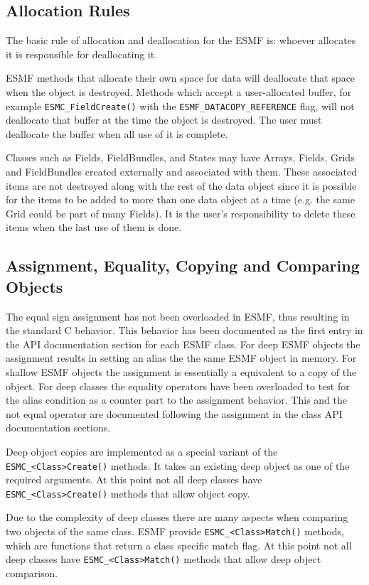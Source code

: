\subsection{Allocation Rules}

The basic rule of allocation and deallocation for the ESMF is:
whoever allocates it is responsible for deallocating it.

ESMF methods that allocate their own space for data will
deallocate that space when the object is destroyed. 
Methods which accept a user-allocated buffer, for example
{\tt ESMC\_FieldCreate()} with the {\tt ESMF\_DATACOPY\_REFERENCE} flag,
will not deallocate that buffer at the time the object is
destroyed.  The user must deallocate the buffer
when all use of it is complete.

Classes such as Fields, FieldBundles, and States may have Arrays, 
Fields, Grids and FieldBundles created externally and associated with
them.  These associated items are not destroyed along with the rest  
of the data object since it is possible for the items to be added 
to more than one data object at a time (e.g. the same Grid could 
be part of many Fields).  It is the user's responsibility to delete 
these items when the last use of them is done.

\subsection{Assignment, Equality, Copying and Comparing Objects}

The equal sign assignment has not been overloaded in ESMF, thus resulting in
the standard C behavior. This behavior has been documented as the first
entry in the API documentation section for each ESMF class. For deep ESMF
objects the assignment results in setting an alias the the same ESMF object
in memory. For shallow ESMF objects the assignment is essentially a equivalent
to a copy of the object. For deep classes the equality operators have been
overloaded to test for the alias condition as a counter part to the assignment
behavior. This and the not equal operator are documented following the
assignment in the class API documentation sections. 

Deep object copies are implemented as a special variant of the
{\tt ESMC\_<Class>Create()} methods. It takes an existing deep object as
one of the required arguments. At this point not all deep classes have
{\tt ESMC\_<Class>Create()} methods that allow object copy.

Due to the complexity of deep classes there are many aspects when comparing two
objects of the same class. ESMF provide {\tt ESMC\_<Class>Match()} methods,
which are functions that return a class specific match flag. At this point not
all deep classes have {\tt ESMC\_<Class>Match()} methods that allow deep object
comparison.

